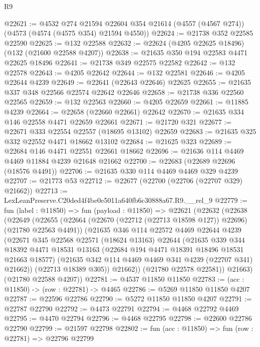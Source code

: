 \begin{lexlean}{R9}
\begin{coremodule}
@22621 := @4532
    @274
    @21594
    @22604
    @354
    @21614
    (@4557 (@4567 @274))
    (@4573 (@4574 (@4575 @354) @21594 @4550))
@22624 := @21738 @352 @22585 @22590
@22625 := @132 @22588
@22632 := @22624 (@4205 @22625 @18496) (@132 (@21600 @22588 @4207))
@22638 := @21635 @350 @194 @22583 @4471 @22625 @18496
@22641 := @21738 @349 @22575 @22582
@22642 := @132 @22578
@22643 := @4205 @22642
@22644 := @132 @22581
@22646 := @4205 @22644 @4239
@22649 := @22641 (@22643 @22646) @22625
@22655 := @21635 @337 @348 @22566 @22574 @22642 @22646
@22658 := @21738 @336 @22560 @22565
@22659 := @132 @22563
@22660 := @4205 @22659
@22661 := @11885 @4239
@22664 := @22658 (@22660 @22661) @22642
@22670 := @21635 @334 @146 @22558 @4471 @22659 @22661
@22671 := @21720 @321
@22677 := @22671 @333 @22554 @22557 (@18695 @13102) @22659
@22683 := @21635 @325 @332 @22552 @4471 @18662 @13102
@22684 := @21625 @323
@22689 := @22684 @146 @4471 @22551 @22661 @18662
@22696 := @21636 @114 @4469 @4469 @11884 @4239 @21648 @21662
@22700 := @22683 (@22689 @22696 (@18576 @4491))
@22706 := @21635 @330 @114 @4469 @4469 @329 @4239
@22707 := @21773 @53
@22712 := @22677 (@22700 (@22706 (@22707 @329) @21662))
@22713 := LexLeanPreserve.C20ded4f4be0e5011a640fb6c30888a67.R9.__rel_9
@22779 := fun (label : @11850) =>
  fun (payload : @11850) =>
  @22621
    (@22632
      (@22638
        (@22649
          (@22655
            (@22664 (@22670 (@22712 (@22713 @18598 @127)) @22696) (@21780 @22563 @4491))
            (@21635
              @346
              @114
              @22572
              @4469
              @22644
              @4239
              (@22671
                @345
                @22568
                @22571
                (@18624 @13163)
                @22644
                (@21635
                  @339
                  @344
                  @18392
                  @4471
                  @18531
                  @13163
                  (@22684 @194 @4471 @18391 @18496 @18531 @21663 @18577)
                  (@21635 @342 @114 @4469 @4469 @341 @4239 (@22707 @341) @21662))
                (@22713 @18389 @305))
              @21662))
          (@21780 @22578 @22581))
        @21663)
      (@21780 @22588 @4207))
@22781 := @4537 @11850 @11850
@22783 := (acc : @11850) -> (row : @22781) -> @4465
@22786 := @5269 @11850 @11850 @4207
@22787 := @22596 @22786
@22790 := @5272 @11850 @11850 @4207
@22791 := @22787 @22790
@22792 := @4473 @22791
@22794 := @4468 @22792 @4469
@22795 := @4470 @22794
@22796 := @4468 @22795
@22798 := @22600 @22786 @22790
@22799 := @21597 @22798
@22802 := fun (acc : @11850) => fun (row : @22781) => @22796 @22799

\end{coremodule}
\end{lexlean}
